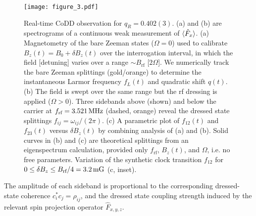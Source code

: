 \documentclass[aps,prl,reprint,superscriptaddress,floatfix]{revtex4-1}
\begin{document}
\begin{figure}
    \texttt{[image: figure\_3.pdf]}
    \caption{
    \label{fig:acquisition_pipeline}
        Real-time CoDD observation for $q_R = 0.402(3)$.
        (a) and (b) are spectrograms of a continuous weak measurement of $\langle \hat{F}_x \rangle$.
        (a) Magnetometry of the bare Zeeman states ($\Omega=0$) used to calibrate $B_z(t) = B_0 + \delta B_z(t)$ over the interrogation interval, in which the field [detuning] varies over a range $\sim B_{\text{rf}}$ [$2\Omega$].
        We numerically track the bare Zeeman splittings (gold/orange) to determine the instantaneous Larmor frequency $f_L(t)$ and quadratic shift $q(t)$.
       (b) The field is swept over the same range but the rf dressing is applied ($\Omega > 0$).
       Three sidebands above (shown) and below the carrier at $f_{\text{rf}}=\unit[3.521]{MHz}$ (dashed, orange) reveal the dressed state splittings $f_{ij} = \omega_{ij}/(2\pi)$.
       (c) A parametric plot of $f_{12}(t)$ and $f_{23}(t)$ versus $\delta B_z(t)$ by combining analysis of (a) and (b).
       Solid curves in (b) and (c) are theoretical splittings from an eigenspectrum calculation, provided only $f_{\text{rf}}$, $B_z(t)$, and $\Omega$, i.e. no free parameters.
       Variation of the synthetic clock transition $f_{12}$ for $0 \leq \delta B_z \leq B_{\text{rf}}/4 = \unit[3.2]{mG}$ (c, inset).
    }
\end{figure}
The amplitude of each sideband is proportional to the corresponding dressed-state coherence $c_i^* c_j = \rho_{ij}$, and the dressed state coupling strength induced by the relevant spin projection operator $\hat{F}_{x,y,z}$.
\end{document}
